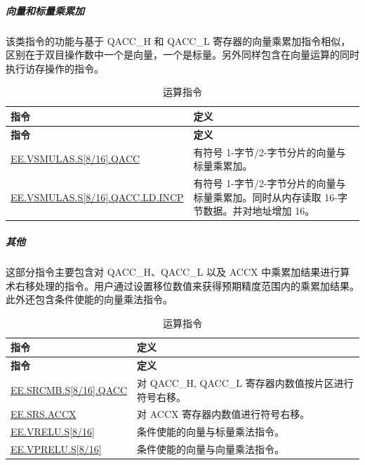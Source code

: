 \documentclass[main\_\_CN.tex]{subfiles}
\begin{document}




\subparagraph{向量和标量乘累加}

该类指令的功能与基于 QACC\_H 和 QACC\_L 寄存器的向量乘累加指令相似，区别在于双目操作数中一个是向量，一个是标量。另外同样包含在向量运算的同时执行访存操作的指令。

\begin{longtable}[c]{|l|m{10cm}|}
    \caption{运算指令}
    \label{tab:pie-vector-scalar-instructions}\\
    \hline
    \rowcolor{lightgray}
    \textbf{指令} & \textbf{定义} \\\hline
    \endfirsthead
    \rowcolor{lightgray}
    \textbf{指令} & \textbf{定义} \\\hline
    \endhead
    \endfoot

    \hyperref[instruction:EEVSMULASS8QACC]{EE.VSMULAS.S[8/16].QACC} & 有符号 1-字节/2-字节分片的向量与标量乘累加。
    \\\hline
    \hyperref[instruction:EEVSMULASS8QACCLDINCP]{EE.VSMULAS.S[8/16].QACC.LD.INCP} & 有符号 1-字节/2-字节分片的向量与标量乘累加。同时从内存读取 16-字节数据。并对地址增加 16。
    \\\hline
\end{longtable}


\subparagraph{其他}

这部分指令主要包含对 QACC\_H、QACC\_L 以及 ACCX 中乘累加结果进行算术右移处理的指令。用户通过设置移位数值来获得预期精度范围内的乘累加结果。\\
此外还包含条件使能的向量乘法指令。

\begin{longtable}[c]{|l|m{10cm}|}
    \caption{运算指令}
    \label{tab:pie-others-instructions}\\
    \hline
    \rowcolor{lightgray}
    \textbf{指令} & \textbf{定义} \\\hline
    \endfirsthead
    \rowcolor{lightgray}
    \textbf{指令} & \textbf{定义} \\\hline
    \endhead
    \endfoot

    \hyperref[instruction:EESRCMBS8QACC]{EE.SRCMB.S[8/16].QACC} & 对 QACC\_H, QACC\_L 寄存器内数值按片区进行符号右移。
    \\\hline
    \hyperref[instruction:EESRSACCX]{EE.SRS.ACCX} & 对 ACCX 寄存器内数值进行符号右移。
    \\\hline
    \hyperref[instruction:EEVRELUS8]{EE.VRELU.S[8/16]} & 条件使能的向量与标量乘法指令。
    \\\hline
    \hyperref[instruction:EEVPRELUS8]{EE.VPRELU.S[8/16]} & 条件使能的向量与向量乘法指令。
    \\\hline
\end{longtable}
\end{document}
